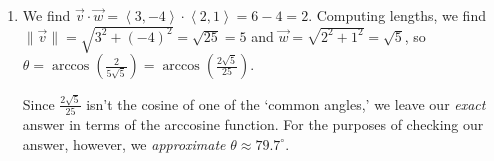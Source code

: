 \documentclass{ximera}
\begin{document}
\begin{example}
\begin{explanation}
\begin{enumerate}
\begin{center}
\begin{minipage}{0.47\textwidth}

\vspace{0.5em}

$\overrightarrow{v}$ and $\overrightarrow{w}$ from number~\ref{anglebetweenvectorextwo}

\end{minipage}

\end{center}

\item  We find $\overrightarrow{v} \cdot \overrightarrow{w} = \left< 3, -4 \right> \cdot \left<2, 1\right> = 6 - 4 = 2$.  Computing lengths, we find $\| \overrightarrow{v} \| = \sqrt{3^2+(-4)^2} = \sqrt{25} = 5$ and $\overrightarrow{w} = \sqrt{2^2+1^2} = \sqrt{5}$, so $\theta = \arccos\left(\frac{2}{5\sqrt{5}}\right) = \arccos\left(\frac{2\sqrt{5}}{25} \right)$. 

 

Since $\frac{2\sqrt{5}}{25}$ isn't the cosine of one of the `common angles,' we leave our \textit{exact} answer in terms of the arccosine function. For the purposes of checking our answer, however, we  \textit{approximate} $\theta \approx 79.7^{\circ}$.



\begin{center}

\end{center}
\end{enumerate}
\end{explanation}
\end{example}
\end{document}
